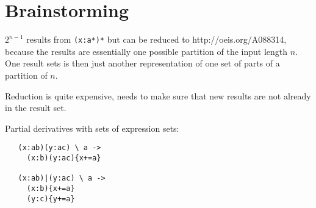 \section{Brainstorming}

$2^{n-1}$ results from \texttt{(x:a*)*} but can be reduced to
http://oeis.org/A088314, because the results are essentially one possible
partition of the input length $n$. One result sets is then just another
representation of one set of parts of a partition of $n$.

Reduction is quite expensive, needs to make sure that new results are not
already in the result set.


Partial derivatives with sets of expression sets:

\begin{verbatim}
   (x:ab)(y:ac) \ a ->
     (x:b)(y:ac){x+=a}

   (x:ab)|(y:ac) \ a ->
     (x:b){x+=a}
     (y:c){y+=a}
\end{verbatim}


